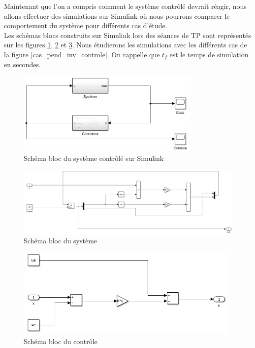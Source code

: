 \documentclass[11pt,french]{article} %
\begin{document}
Maintenant que l'on a compris comment le système contrôlé devrait réagir, nous allons effectuer des simulations sur Simulink où nous pourrons comparer le comportement du système pour différents cas d'étude. \\

Les schémas blocs construits sur Simulink lors des séances de TP sont représentés sur les figures \ref{fig:simulink_controle_pend_inv}, \ref{fig:systeme_pend_inv} et \ref{fig:controle_pend_inv}. Nous étudierons les simulations avec les différents cas de la figure \ref{cas_pend_inv_controle}. On rappelle que $t_f$ est le temps de simulation en secondes.

\begin{figure}[H]
    \centering
    \includegraphics[width=9cm]{simulink_controle_pend_inv.png} %
		\caption{Schéma bloc du système contrôlé sur Simulink}
		\label{fig:simulink_controle_pend_inv}
\end{figure}
\vspace{2cm}

\begin{figure}[H]
    \centering
		\advance\leftskip-2cm
    \includegraphics[width=19cm]{systeme_pend_inv.png} %
		\caption{Schéma bloc du système}
		\label{fig:systeme_pend_inv}
\end{figure}
\vspace{0.5cm}

\begin{figure}[H]
    \centering
    \includegraphics[width=11cm]{controle_pend_inv.png} %
		\caption{Schéma bloc du contrôle}
		\label{fig:controle_pend_inv}
\end{figure}
\vspace{0.5cm}
\end{document}
